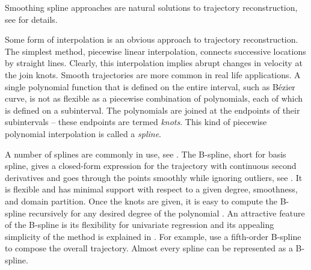 Smoothing spline approaches are natural solutions to trajectory reconstruction, see 
\eg \citep{eubank2004simple, durbin2012time} for details. 

Some form of interpolation is an obvious approach to trajectory reconstruction. The simplest method, piecewise linear interpolation, connects successive locations by straight lines. Clearly, this interpolation implies abrupt changes in velocity at the join knots. Smooth trajectories are more common in real life applications. A single polynomial function that is defined on the entire interval, such as B\'ezier curve, is not as flexible as a piecewise combination of polynomials, each of which is defined on a subinterval. The polynomials are joined at the endpoints of their subintervals -- these endpoints are termed \textit{knots}. This kind of piecewise polynomial interpolation is called a \textit{spline}. 


A number of splines are commonly in use, see \eg \citep{esl2009}. The B-spline, short for basis spline, gives a closed-form expression for the trajectory with continuous second derivatives and goes through the points smoothly while ignoring outliers, see \eg \citep{komoriya1989trajectory, ben2004geometric}. It is flexible and has minimal support with respect to a given degree, smoothness, and domain partition. Once the knots are given, it is easy to compute the B-spline recursively for any desired degree of the polynomial \citep{de1978practical, cox1982practical}. An attractive feature of the B-spline is its flexibility for univariate regression and its appealing simplicity of the method is explained in \citep{dierckx1995curve, eilers1996flexible}. For example,  \cite{gasparetto2007new} use a fifth-order B-spline to compose the overall trajectory. Almost every spline can be represented as a B-spline. 

